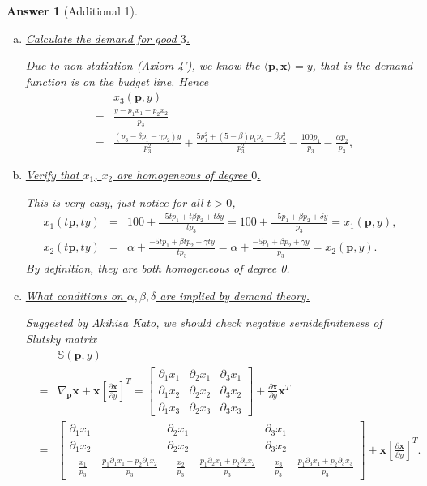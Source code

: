 \documentclass{article}
\newtheorem*{ans}{Answer}
\newcommand{\1}{{\bf 1}}
\newcommand{\bbS}{\mathbb{S}}
\newcommand{\0}{{\mathbf{0}}}
\newcommand{\p}{{\mathbf{p}}}
\newcommand{\x}{{\mathbf{x}}}
\newcommand{\<}{\langle}
\renewcommand{\>}{\rangle}
\begin{document}
\begin{ans}[Additional 1]
	\begin{enumerate}[(a)]
		\item \underline{Calculate the demand for good $3$.}
		
		Due to non-statiation (Axiom 4'), we know the $\langle \p,\x\rangle =y$, that is the demand function is on the budget line. Hence
\begin{eqnarray*}
		&&x_3 (\p,y)\\
		& = &  \frac{y-p_1x_1-p_2x_2}{p_3} \\
		 & = & \frac{(p_3 - \delta p_1- \gamma p_2)y}{p_3^2} + \frac{5p_1^2 + (5-\beta)p_1p_2 - \beta p_2^2}{p_3^2} - \frac{100 p_1}{p_3} - \frac{\alpha p_2}{p_3},
\end{eqnarray*}
		\item \underline{Verify that $x_1$, $x_2$ are homogeneous of degree $0$.}
		
		This is very easy, just notice  for all $t > 0$,
		\begin{eqnarray*}x_1(t\p,ty)& = & 100+\frac{- 5 tp_1 + t\beta p_2 + t\delta y}{ tp_3} = 100  +\frac{- 5 p_1 + \beta p_2 + \delta y}{ p_3}  = x_1(\p,y), \\
			x_2(t\p,ty) & = &  \alpha +\frac{ - 5tp_1 +\beta tp_2 + \gamma ty}{tp_3} =  \alpha +\frac{- 5 p_1+ \beta p_2 + \gamma y}{p_3}= x_2(\p,y).
		\end{eqnarray*}
	By definition, they are both homogeneous of degree 0.
		\item \underline{What conditions on $\alpha,\beta,\delta$ are implied by demand theory.}
		
		Suggested by Akihisa Kato, we should check negative semidefiniteness of Slutsky matrix
\begin{eqnarray*}
	&&	\bbS(\p,y) \\
		& = &  \nabla_{\p} \x  + \x \left[\frac{\partial \x}{\partial y}\right]^T = \begin{bmatrix}
		\partial_1 x_1 & 		\partial_2 x_1  & 		\partial_3 x_1 \\
				\partial_1 x_2 & 		\partial_2 x_2  & 		\partial_3 x_2 \\
						\partial_1 x_3 & 		\partial_2 x_3  & 		\partial_3 x_3
		\end{bmatrix} + \frac{\partial \x}{\partial y} \x^T \\
	&= & \begin{bmatrix}
		\partial_1 x_1 & 		\partial_2 x_1  & 		\partial_3 x_1 \\
		\partial_1 x_2 & 		\partial_2 x_2  & 		\partial_3 x_2 \\
		- \frac{x_1}{p_3} - \frac{p_1 \partial_1 x_1 + p_2 \partial_1 x_2}{p_3}& 		- \frac{x_2}{p_3} - \frac{p_1 \partial_2 x_1 + p_2 \partial_2 x_2}{p_3} & 	-\frac{x_3}{ p_3 }- \frac{p_1 \partial_3 x_1 + p_2 \partial_3 x_3}{p_3}
		\end{bmatrix}  +  \x \left[\frac{\partial \x}{\partial y}\right]^T.
\end{eqnarray*}


\end{enumerate}
\end{ans}
\end{document}

